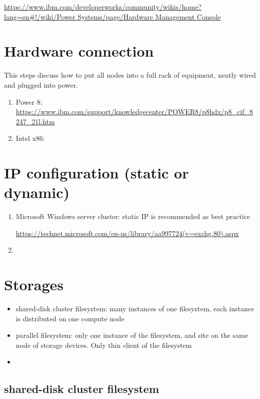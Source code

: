 \url{https://www.ibm.com/developerworks/community/wikis/home?lang=en#!/wiki/Power Systems/page/Hardware Management Console}

\section{Hardware connection}

This steps discuss how to put all nodes into a full rack of equipment, neatly
wired and plugged into power.

\begin{enumerate}
  \item Power 8:
  \url{https://www.ibm.com/support/knowledgecenter/POWER8/p8hdx/p8_cif_8247_21l.htm}
  
  
  \item Intel x86: 
\end{enumerate}
\section{IP configuration (static or dynamic)}


\begin{enumerate}
  \item Microsoft Windows server cluster: static IP is recommended as best
  practice
  
  \url{https://technet.microsoft.com/en-us/library/aa997724(v=exchg.80).aspx}
  
  
  \item 
\end{enumerate}

\section{Storages}


\begin{itemize}
  \item shared-disk cluster filesystem:
  many instances of one filesystem, each instance is distributed on one compute
  node
  
  
  \item parallel filesystem:  only one instance of the filesystem, and site on
  the same node of storage devices. Only thin client of the filesystem 
  
  
  \item
\end{itemize}


\subsection{shared-disk cluster filesystem}
\label{sec:shared-disk-cluster-filesystem}

